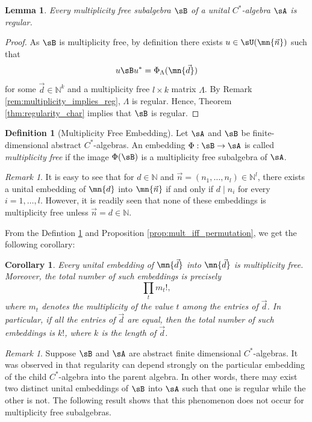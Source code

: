 \documentclass[12pt,a4paper]{amsart}
\theoremstyle{plain}
\newtheorem{lem}[theorem]{Lemma}
\newtheorem{cor}[theorem]{Corollary}
\theoremstyle{definition}
\newtheorem{definition}[theorem]{Definition}
\theoremstyle{remark}
\newtheorem{remark}[theorem]{Remark}
\numberwithin{equation}{section}
\theoremstyle{ser}
\theoremstyle{serr}
\theoremstyle{ser}
\theoremstyle{ser}
\theoremstyle{collabquestion}
\newcommand{\N}{\mathbb{N}}
\newcommand{\<}{\langle}
\renewcommand{\>}{\rangle}
\begin{document}
\begin{lem}\label{lem:mult-free-is-regular}
Every multiplicity free subalgebra $\sB$ of a unital $C^*$-algebra $\sA$ is regular.    
\end{lem}
\begin{proof}
   As $\sB$ is multiplicity free, by definition there exists $u \in \sU(\mn{\vec{n}})$ such that
\[
u\sB u^*=\Phi_{\Lambda}(\mn{\vec{d}})
\]
for some $\vec{d}\in\N^k$ and a multiplicity free $l\times k$ matrix $\Lambda$. By Remark \ref{rem:multiplicity_implies_reg}, $\Lambda$ is regular. Hence, Theorem \ref{thm:regularity_char} implies that $\sB$ is regular.

\end{proof}
\begin{definition}[Multiplicity Free Embedding]\label{def:mult_free_embed}
    Let $\sA$ and $\sB$ be finite-dimensional abstract $C^*$-algebras. An embedding $\Phi:\sB \to \sA$ is called \emph{multiplicity free} if the image $\Phi(\sB)$ is a multiplicity free subalgebra of $\sA$.
\end{definition}

\begin{remark}
    It is easy to see that for $d\in \N$ and $\vec{n}=(n_1, \dots, n_l)\in \N^l$, there exists a unital embedding of $\mn{d}$ into $\mn{\vec{n}}$ if and only if $d \mid n_i$ for every $i=1,\dots,l$. However, it is readily seen that none of these embeddings is multiplicity free unless $\vec{n}=d\in\N$.
\end{remark}


From the Defintion \ref{def:mult_free_embed} and Proposition \ref{prop:mult_iff_permutation}, we get the following corollary:

\begin{cor}
    Every unital embedding of $\mn{\vec{d}}$ into $\mn{\vec{d}}$ is multiplicity free. Moreover, the total number of such embeddings is precisely
    \[
        \prod_{t} m_t!,
    \]
    where $m_t$ denotes the multiplicity of the value $t$ among the entries of $\vec{d}$. In particular, if all the entries of $\vec{d}$ are equal, then the total number of such embeddings is $k!$, where $k$ is the length of $\vec{d}$.
\end{cor}

\begin{remark}
    Suppose $\sB$ and $\sA$ are abstract finite dimensional $C^*$-algebras. It was observed in \cite[Remark 4.8]{BGK2026} that regularity can depend strongly on the particular embedding of the child $C^*$-algebra into the parent algebra. In other words, there may exist two distinct unital embeddings of $\sB$ into $\sA$ such that one is regular while the other is not. The following result shows that this phenomenon does not occur for multiplicity free subalgebras.
\end{remark}
\end{document}
